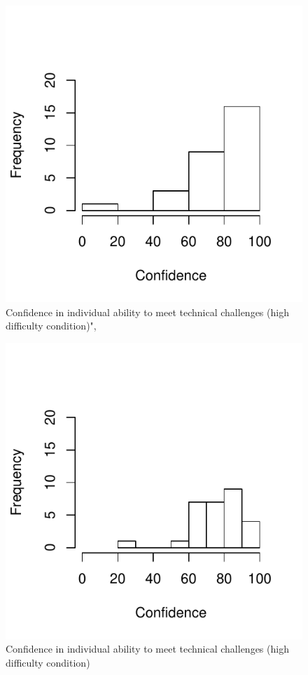 \begin{figure}
  \centering
  \includegraphics[width=0.5\linewidth,keepaspectratio] {images/histHighIndConfidence-1}
  \caption{Confidence in individual ability to meet technical challenges (high difficulty condition)",}
  \label{fig:histHighIndConfidence}
\end{figure}


\begin{figure}
  \centering
  \includegraphics[width=0.5\linewidth,keepaspectratio] {images/histLowIndConfidence-1}
  \caption{Confidence in individual ability to meet technical challenges (high difficulty condition)}
  \label{fig:histLowIndConfidence}
\end{figure}




